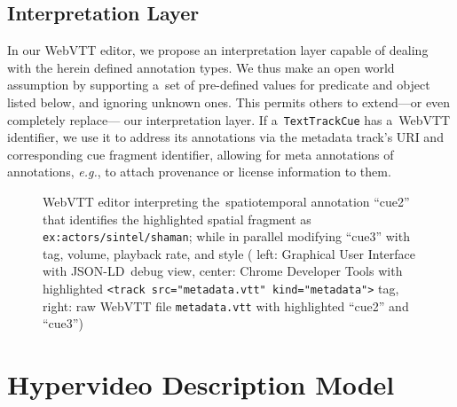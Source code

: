 \documentclass[runningheads,a4paper]{llncs}
\def\JSONLD{\mbox{JSON-LD}}
\def\JSONLD{\mbox{JSON-LD}}
\begin{document}
\subsection{Interpretation Layer}

In our WebVTT editor,
we propose an interpretation layer
capable of dealing with the herein defined annotation types. 
We thus make an open world assumption
by supporting a~set of pre-defined values for predicate and object
listed below, and ignoring unknown ones.
This permits others to extend---or even completely replace---%
our interpretation layer.
If a~\texttt{TextTrackCue} has a~WebVTT identifier,
we use it to address its annotations
via the metadata track's URI
and corresponding cue fragment identifier,
allowing for meta annotations of annotations, \emph{e.g.},
to attach provenance or license information to them.

\begin{figure}[hbt]
  \centering
  \caption{WebVTT editor interpreting the~spatiotemporal annotation ``cue2''
    that identifies the highlighted spatial fragment as \texttt{ex:actors/sintel/shaman};
    while in parallel modifying ``cue3'' with tag, volume, playback rate,
    and style ( left: Graphical User Interface with \JSONLD\ debug view,
   center: Chrome Developer Tools with highlighted
  \texttt{<track src="metadata.vtt" kind="metadata">} tag,
   right: raw WebVTT file \texttt{metadata.vtt} with highlighted ``cue2'' and ``cue3'')}
  \label{fig:webvtt-editor}
\end{figure}

\section{Hypervideo Description Model}
\label{sec:hypervideo-description-model}
\end{document}
